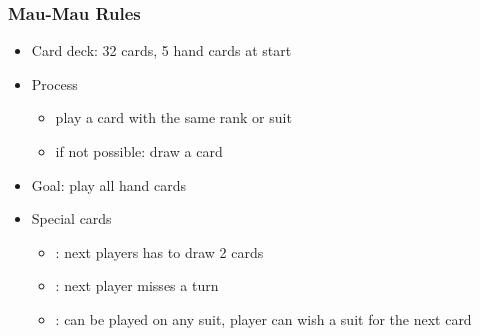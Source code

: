 
\begin{frame}
    \frametitle{Mau-Mau Rules}
    \begin{itemize}
        \item Card deck: 32 cards, 5 hand cards at start
    \item Process
        \begin{itemize}
            \item play a card with the same rank or suit
            \item if not possible: draw a card
        \end{itemize}
    \item Goal: play all hand cards
    \item Special cards
        \begin{itemize}
            \item {} : next players has to draw 2 cards
            \item {} :  next player misses a turn
            \item {} : can be played on any suit, player can wish a suit for the next card
        \end{itemize}
    \end{itemize}
\end{frame}
